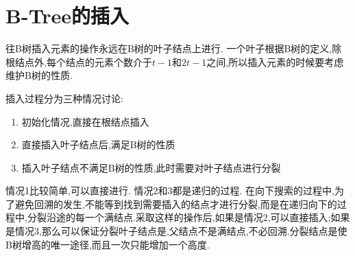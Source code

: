 \documentclass[12pt]{article}
\begin{document}
  	\section{B-Tree的插入}
  	往B树插入元素的操作永远在B树的叶子结点上进行. 一个叶子根据B树的定义,除根结点外,每个结点的元素个数介于$t-1$和$2t-1$之间,所以插入元素的时候要考虑维护B树的性质.
  	
  	插入过程分为三种情况讨论:
  	\begin{enumerate}
  		\item 初始化情况,直接在根结点插入
  		\item 直接插入叶子结点后,满足B树的性质
  		\item 插入叶子结点不满足B树的性质,此时需要对叶子结点进行分裂
  	\end{enumerate}
  
    情况1比较简单,可以直接进行. 情况2和3都是递归的过程. 在向下搜索的过程中,为了避免回溯的发生,不能等到找到需要插入的结点才进行分裂,而是在递归向下的过程中,分裂沿途的每一个满结点.采取这样的操作后,如果是情况2,可以直接插入;如果是情况3,那么可以保证分裂叶子结点是,父结点不是满结点,不必回溯.分裂结点是使B树增高的唯一途径,而且一次只能增加一个高度.
    
\end{document}
